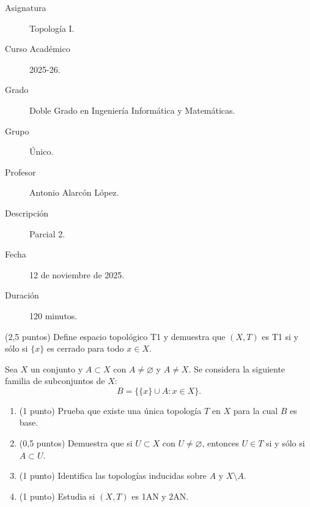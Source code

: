 \documentclass[12pt]{article}
\begin{document}

    
    

    \begin{description}
        \item[Asignatura] Topología I.
        \item[Curso Académico] 2025-26.
        \item[Grado] Doble Grado en Ingeniería Informática y Matemáticas.
        \item[Grupo] Único.
        \item[Profesor] Antonio Alarcón López.
        \item[Descripción] Parcial 2.
        \item[Fecha] 12 de noviembre de 2025.
        \item[Duración] 120 minutos.
    
    \end{description}
    \newpage

    \begin{ejercicio}
    (2,5 puntos) Define espacio topológico T1 y demuestra que $(X, T)$ es T1 si y sólo si $\{x\}$ es cerrado para todo $x \in X$.
    \end{ejercicio}

    \begin{ejercicio}
    Sea $X$ un conjunto y $A \subset X$ con $A \neq \varnothing$ y $A \neq X$. Se considera la siguiente familia de subconjuntos de $X$:
    \[
        B = \{\{x\} \cup A : x \in X\}.
    \]
    \begin{enumerate}
        \item (1 punto) Prueba que existe una única topología $T$ en $X$ para la cual $B$ es base.
        \item (0,5 puntos) Demuestra que si $U \subset X$ con $U \neq \varnothing$, entonces $U \in T$ si y sólo si $A \subset U$.
        \item (1 punto) Identifica las topologías inducidas sobre $A$ y $X \setminus A$.
        \item (1 punto) Estudia si $(X, T)$ es 1AN y 2AN.
    \end{enumerate}
    \end{ejercicio}
\end{document}
